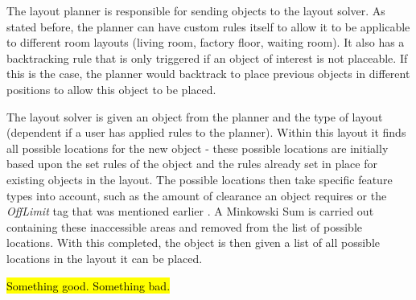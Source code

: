 The layout planner is responsible for sending objects to the layout solver. As stated before, the planner can have custom rules itself to allow it to be applicable to different room layouts (living room, factory floor, waiting room). It also has a backtracking rule that is only triggered if an object of interest is not placeable. If this is the case, the planner would backtrack to place previous objects in different positions to allow this object to be placed.

The layout solver is given an object from the planner and the type of layout (dependent if a user has applied rules to the planner). Within this layout it finds all possible locations for the new object - these possible locations are initially based upon the set rules of the object and the rules already set in place for existing objects in the layout. The possible locations then take specific feature types into account, such as the amount of clearance an object requires or the \textit{OffLimit} tag that was mentioned earlier \cite{rule-based-layout}. A Minkowski Sum \cite{minkowski} is carried out containing these inaccessible areas and removed from the list of possible locations.
With this completed, the object is then given a list of all possible locations in the layout it can be placed.

\hl{Something good. Something bad.}

